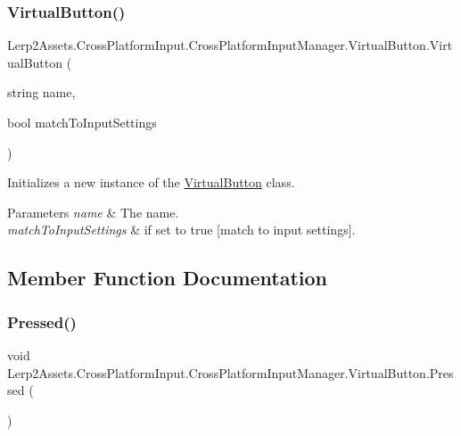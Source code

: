 \subsubsection{\texorpdfstring{Virtual\+Button()}{VirtualButton()}\hspace{0.1cm}{\footnotesize\ttfamily [2/2]}}
{\footnotesize\ttfamily Lerp2\+Assets.\+Cross\+Platform\+Input.\+Cross\+Platform\+Input\+Manager.\+Virtual\+Button.\+Virtual\+Button (\begin{DoxyParamCaption}\item[{string}]{name,  }\item[{bool}]{match\+To\+Input\+Settings }\end{DoxyParamCaption})\hspace{0.3cm}{\ttfamily [inline]}}



Initializes a new instance of the \hyperlink{class_lerp2_assets_1_1_cross_platform_input_1_1_cross_platform_input_manager_1_1_virtual_button}{Virtual\+Button} class. 


\begin{DoxyParams}{Parameters}
{\em name} & The name.\\
\hline
{\em match\+To\+Input\+Settings} & if set to {\ttfamily true} \mbox{[}match to input settings\mbox{]}.\\
\hline
\end{DoxyParams}


\subsection{Member Function Documentation}
\mbox{\label{class_lerp2_assets_1_1_cross_platform_input_1_1_cross_platform_input_manager_1_1_virtual_button_aa88107bb11608e772e6f950fe9c63912}} 
\subsubsection{\texorpdfstring{Pressed()}{Pressed()}}
{\footnotesize\ttfamily void Lerp2\+Assets.\+Cross\+Platform\+Input.\+Cross\+Platform\+Input\+Manager.\+Virtual\+Button.\+Pressed (\begin{DoxyParamCaption}{ }\end{DoxyParamCaption})\hspace{0.3cm}{\ttfamily [inline]}}



